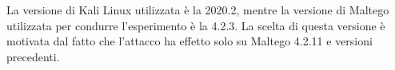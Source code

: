 La versione di Kali Linux utilizzata è la 2020.2, mentre la versione di Maltego utilizzata per condurre l'esperimento è la 4.2.3. La scelta di questa versione è motivata dal fatto che l'attacco ha effetto solo su Maltego 4.2.11 e versioni precedenti.